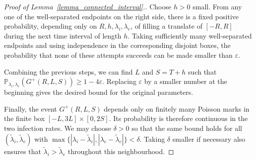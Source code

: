\documentclass[11pt,a4paper]{article}
\theoremstyle{plain}
\theoremstyle{definition}
\theoremstyle{remark}
\numberwithin{equation}{section}
\newenvironment{acks}[1][Acknowledgments]
  {\par\medskip\noindent\textbf{#1.}\space\ignorespaces}
  {\par}
\begin{document}
\begin{proof}[Proof of Lemma~\ref{lemma_connected_interval}.]
		Choose $h>0$ small. From any one of the well-separated endpoints on the right side, there is a fixed positive probability, depending only on $R,h,\lambda_i,\lambda_e$, of filling a translate of $[-R,R]$ during the next time interval of length $h$. Taking sufficiently many well-separated endpoints and using independence in the corresponding disjoint boxes, the probability that none of these attempts succeeds can be made smaller than $\varepsilon$.
		
		Combining the previous steps, we can find $L$ and $S=T+h$ such that $\mathbb{P}_{\lambda_i,\lambda_e}(G^+(R,L,S))\geq1-4\varepsilon$. Replacing $\varepsilon$ by a smaller number at the beginning gives the desired bound for the original parameters.
		
		Finally, the event $G^+(R,L,S)$ depends only on finitely many Poisson marks in the finite box $[-L,3L]\times[0,2S]$. Its probability is therefore continuous in the two infection rates. We may choose $\delta>0$ so that the same bound holds for all $(\tilde\lambda_i,\tilde\lambda_e)$ with $\max\{|\lambda_i-\tilde\lambda_i|,|\lambda_e-\tilde\lambda_e|\}<\delta$. Taking $\delta$ smaller if necessary also ensures that $\tilde\lambda_i>\tilde\lambda_e$ throughout this neighbourhood.
	\end{proof}
	
	
	
	
	
	
	
	
\end{document}

